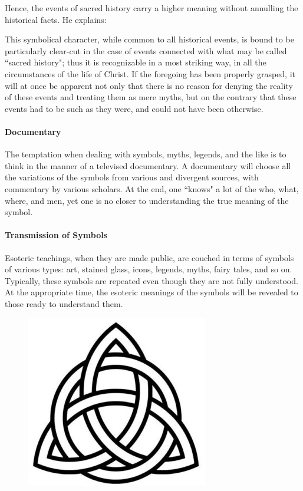 Hence, the events of sacred history carry a higher meaning without annulling the historical facts. He explains:

\begin{quotex}
This symbolical character, while common to all historical events, is bound to be particularly clear-cut in the case of events connected with what may be called ``sacred history"; thus it is recognizable in a most striking way, in all the circumstances of the life of Christ. If the foregoing has been properly grasped, it will at once be apparent not only that there is no reason for denying the reality of these events and treating them as mere myths, but on the contrary that these events had to be such as they were, and could not have been otherwise. 

\end{quotex}
\paragraph{Documentary}
The temptation when dealing with symbols, myths, legends, and the like is to think in the manner of a televised documentary. A documentary will choose all the variations of the symbols from various and divergent sources, with commentary by various scholars. At the end, one ``knows" a lot of the who, what, where, and men, yet one is no closer to understanding the true meaning of the symbol.

\paragraph{Transmission of Symbols}
Esoteric teachings, when they are made public, are couched in terms of symbols of various types: art, stained glass, icons, legends, myths, fairy tales, and so on. Typically, these symbols are repeated even though they are not fully understood. At the appropriate time, the esoteric meanings of the symbols will be revealed to those ready to understand them.

\begin{figure}
 \includegraphics[scale=.3]{a20210403TheSymbolicWorld-img001.jpg}
\end{figure}

